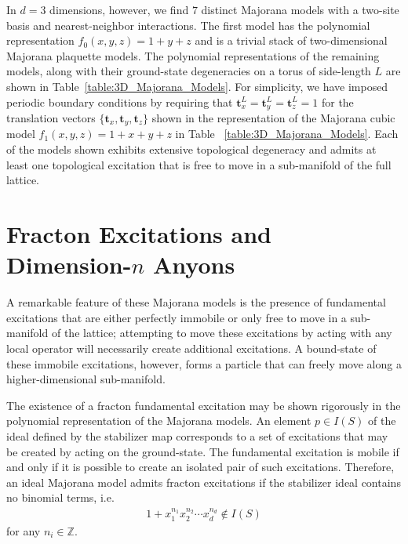 \documentclass[aps,twocolumn,preprintnumbers,floatfix,showpacs,prx]{revtex4-1}
\begin{document}
In $d = 3$ dimensions, however, we find $7$ distinct Majorana models
with a two-site basis and nearest-neighbor interactions.  The first model has the polynomial representation $f_{0}(x,y,z) = 1 + y + z$ and is a trivial stack of two-dimensional Majorana plaquette models. 
The polynomial representations of the remaining models,
along with their ground-state degeneracies on a torus of side-length $L$ are shown in Table~\ref{table:3D_Majorana_Models}.  For simplicity, we have imposed periodic boundary conditions by requiring that $\boldsymbol{t}_{x}^{L} = \boldsymbol{t}_{y}^{L} = \boldsymbol{t}_{z}^{L} = 1$ for the translation vectors $\{\boldsymbol{t}_{x}, \boldsymbol{t}_{y}, \boldsymbol{t}_{z}\}$ shown in the representation of the Majorana cubic model $f_{1}(x,y,z) = 1 + x + y + z$ in Table ~\ref{table:3D_Majorana_Models}. 
Each of the models shown exhibits extensive topological degeneracy and admits at least one topological excitation that is free to move in a sub-manifold of the full lattice.

\section{Fracton Excitations and Dimension-$n$ Anyons}
\label{sec:fracton}

A remarkable feature of these Majorana models is the presence of fundamental excitations that are either perfectly immobile or only free to move in a sub-manifold of the lattice;
attempting to move these excitations by acting with any local operator
will necessarily create additional excitations.
A bound-state of these immobile excitations, however,
forms a particle that can freely move along a higher-dimensional sub-manifold.  

The existence of a fracton fundamental excitation
may be shown rigorously in the polynomial representation of the Majorana models.
An element $p\in I(S)$ of the ideal defined by the stabilizer map
corresponds to a set of excitations that may be created by acting on the ground-state.
The fundamental excitation is mobile
if and only if it is possible to create an isolated pair of such excitations.
Therefore, an ideal Majorana model admits fracton excitations if the stabilizer ideal contains no binomial terms, i.e.
\begin{align}
1 + x_{1}^{n_{1}}x_{2}^{n_{2}}\cdots x_{d}^{n_{d}} \notin I(S)
\end{align}
for any $n_{i}\in\mathbb{Z}$.
\end{document}
